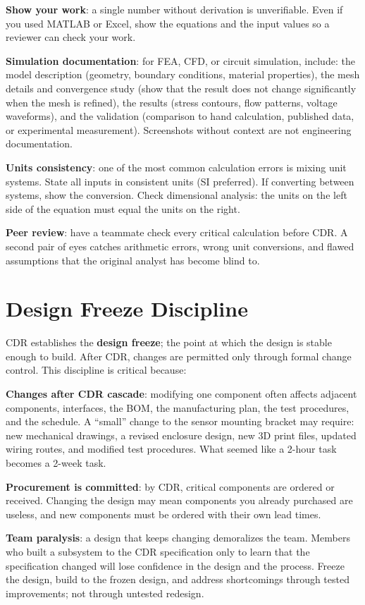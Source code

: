 \textbf{Show your work}: a single number without derivation is unverifiable. Even if you used MATLAB or Excel, show the equations and the input values so a reviewer can check your work.

\textbf{Simulation documentation}: for FEA, CFD, or circuit simulation, include: the model description (geometry, boundary conditions, material properties), the mesh details and convergence study (show that the result does not change significantly when the mesh is refined), the results (stress contours, flow patterns, voltage waveforms), and the validation (comparison to hand calculation, published data, or experimental measurement). Screenshots without context are not engineering documentation.

\textbf{Units consistency}: one of the most common calculation errors is mixing unit systems. State all inputs in consistent units (SI preferred). If converting between systems, show the conversion. Check dimensional analysis: the units on the left side of the equation must equal the units on the right.

\textbf{Peer review}: have a teammate check every critical calculation before CDR. A second pair of eyes catches arithmetic errors, wrong unit conversions, and flawed assumptions that the original analyst has become blind to.



\section{Design Freeze Discipline}
CDR establishes the \textbf{design freeze}; the point at which the design is stable enough to build. After CDR, changes are permitted only through formal change control. This discipline is critical because:

\textbf{Changes after CDR cascade}: modifying one component often affects adjacent components, interfaces, the BOM, the manufacturing plan, the test procedures, and the schedule. A ``small'' change to the sensor mounting bracket may require: new mechanical drawings, a revised enclosure design, new 3D print files, updated wiring routes, and modified test procedures. What seemed like a 2-hour task becomes a 2-week task.

\textbf{Procurement is committed}: by CDR, critical components are ordered or received. Changing the design may mean components you already purchased are useless, and new components must be ordered with their own lead times.

\textbf{Team paralysis}: a design that keeps changing demoralizes the team. Members who built a subsystem to the CDR specification only to learn that the specification changed will lose confidence in the design and the process. Freeze the design, build to the frozen design, and address shortcomings through tested improvements; not through untested redesign.

